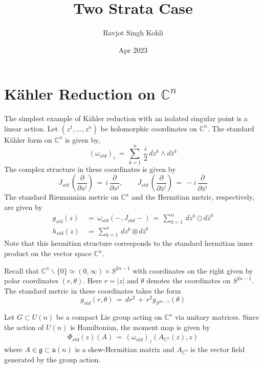 \documentclass[a4paper,12pt]{article}
\title{Two Strata Case}
\author{Ravjot Singh Kohli}
\date{Apr 2023}
\newcommand{\C}{\mathbb{C}}
\newcommand{\abs}[1]{\lvert #1 \rvert}
\begin{document}
	\maketitle
	
	\section{K\"ahler Reduction on $\C^n$}
	The simplest example of K\"ahler reduction with an isolated singular point is a linear action. Let $(z^1,\dots,z^n)$ be holomorphic coordinates on $\C^n$. The standard K\"ahler form on $\C^n$ is given by,
	\begin{equation}\label{standardkahler}
		(\omega_{std})_{z} \,=\,  \sum_{k=1}^n \, \frac{i}{2} \, dz^k \wedge d\bar{z}^k
	\end{equation}
	The complex structure in these coordinates is given by 
	\begin{equation}
		J_{std}\, \left(\frac{\partial}{\partial z^j} \right) \,=\, i \, \frac{\partial}{\partial z^j}, \qquad J_{std}\, \left( \frac{\partial}{\partial \bar{z}^j} \right) \,=\, -i \, \frac{\partial}{\partial \bar{z}^j}
	\end{equation}
	The standard Riemannian metric on $\C^n$ and the Hermitian metric, respectively, are given by
	\begin{equation}
		\begin{split}
			g_{std}(z) \,&=\, \omega_{std}(-,J_{std}-) \,=\, \sum_{k=1}^n \, dz^k \odot d\bar{z}^k \\
			h_{std}(z) \,&=\, \sum_{k=1}^n \, dz^k \otimes d\bar{z}^k
		\end{split}
	\end{equation}
	Note that this hermitian structure corresponds to the standard hermitian inner product on the vector space $\C^n$.
	
	Recall that $\C^n\backslash\{0\} \simeq (0,\infty) \times S^{2n-1}$ with coordinates on the right given by polar coordinates $(r,\theta)$. Here $r = \abs{z}$ and $\theta$ denotes the coordinates on $S^{2n-1}$.
	The standard metric in these coordinates takes the form
	\begin{equation}
		g_{std}(r,\theta) \,=\, dr^2 \,+\, r^2 g_{S^{2n-1}}(\theta)
	\end{equation}
	
	Let $G\subset U(n)$ be a compact Lie group acting on $\C^n$ via unitary matrices. Since the action of $U(n)$ is Hamiltonian, the moment map is given by
	\begin{align*}\label{standardmoment}
		\Phi_{std}(z) (A) \,=\, (\omega_{std})_z(A_{\C^n}(z), z)
	\end{align*}
	where $A\in \mathfrak{g}\subset \mathfrak{u}(n)$ is a skew-Hermitian matrix and $A_{\C^n}$ is the vector field generated by the group action.	
	
\end{document}
